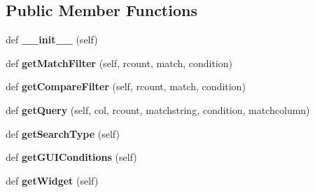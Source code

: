 \subsection*{Public Member Functions}
\begin{DoxyCompactItemize}
\item 
\mbox{\label{classdatatypes_1_1Visitor__Numbers__Data_1_1Visitor__Numbers__Data_a76e3893d6f3245d46fd40cece7f9bfe5}} 
def {\bfseries \+\_\+\+\_\+init\+\_\+\+\_\+} (self)
\item 
\mbox{\label{classdatatypes_1_1Visitor__Numbers__Data_1_1Visitor__Numbers__Data_a1672d6696c315cf2a444b0aa5208d3dd}} 
def {\bfseries get\+Match\+Filter} (self, rcount, match, condition)
\item 
\mbox{\label{classdatatypes_1_1Visitor__Numbers__Data_1_1Visitor__Numbers__Data_a9545d4dc1b1074682cd2384f7c612df2}} 
def {\bfseries get\+Compare\+Filter} (self, rcount, match, condition)
\item 
\mbox{\label{classdatatypes_1_1Visitor__Numbers__Data_1_1Visitor__Numbers__Data_ad3cbcff6068c458cad569baef54e8814}} 
def {\bfseries get\+Query} (self, col, rcount, matchstring, condition, matchcolumn)
\item 
\mbox{\label{classdatatypes_1_1Visitor__Numbers__Data_1_1Visitor__Numbers__Data_a90fc15672cad2e0c36712e9238af7ceb}} 
def {\bfseries get\+Search\+Type} (self)
\item 
\mbox{\label{classdatatypes_1_1Visitor__Numbers__Data_1_1Visitor__Numbers__Data_a7bc3ea84ca1f082e7cccfe2b881d0ff9}} 
def {\bfseries get\+G\+U\+I\+Conditions} (self)
\item 
\mbox{\label{classdatatypes_1_1Visitor__Numbers__Data_1_1Visitor__Numbers__Data_af2b2c64d6d5a24a7fcfc86699948415b}} 
def {\bfseries get\+Widget} (self)

\end{DoxyCompactItemize}
